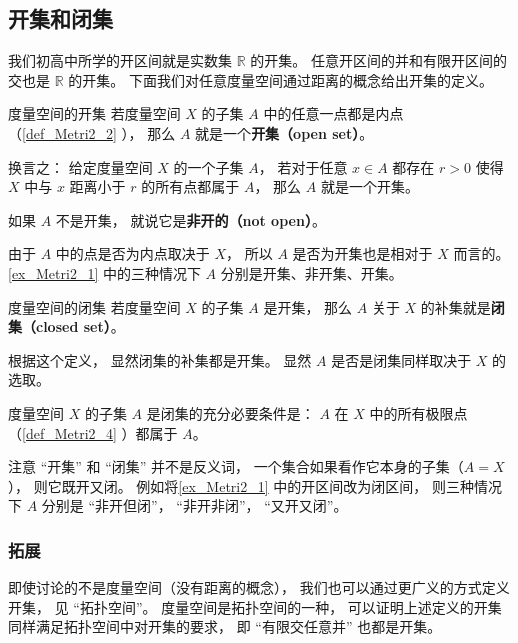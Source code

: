 
\subsection{开集和闭集}
我们初高中所学的开区间就是实数集 $\mathbb R$ 的开集。 任意开区间的并和有限开区间的交也是 $\mathbb R$ 的开集。 下面我们对任意度量空间通过距离的概念给出开集的定义。

\begin{definition}{度量空间的开集}
若度量空间 $X$ 的子集 $A$ 中的任意一点都是内点（\autoref{def_Metri2_2} ）， 那么 $A$ 就是一个\textbf{开集（open set）}。

换言之： 给定度量空间 $X$ 的一个子集 $A$， 若对于任意 $x \in A$ 都存在 $r > 0$ 使得 $X$ 中与 $x$ 距离小于 $r$ 的所有点都属于 $A$， 那么 $A$ 就是一个开集。

如果 $A$ 不是开集， 就说它是\textbf{非开的（not open）}。
\end{definition}
由于 $A$ 中的点是否为内点取决于 $X$， 所以 $A$ 是否为开集也是相对于 $X$ 而言的。 \autoref{ex_Metri2_1} 中的三种情况下 $A$ 分别是开集、非开集、开集。

\begin{definition}{度量空间的闭集}
若度量空间 $X$ 的子集 $A$ 是开集， 那么 $A$ 关于 $X$ 的补集就是\textbf{闭集（closed set）}。
\end{definition}
根据这个定义， 显然闭集的补集都是开集。 显然 $A$ 是否是闭集同样取决于 $X$ 的选取。

\begin{theorem}{}
度量空间 $X$ 的子集 $A$ 是闭集的充分必要条件是： $A$ 在 $X$ 中的所有极限点（\autoref{def_Metri2_4} ）都属于 $A$。
\end{theorem}
注意 “开集” 和 “闭集” 并不是反义词， 一个集合如果看作它本身的子集（$A = X$）， 则它既开又闭。 例如将\autoref{ex_Metri2_1} 中的开区间改为闭区间， 则三种情况下 $A$ 分别是 “非开但闭”， “非开非闭”， “又开又闭”。

\subsubsection{拓展}
即使讨论的不是度量空间（没有距离的概念）， 我们也可以通过更广义的方式定义开集， 见 “拓扑空间”。 度量空间是拓扑空间的一种， 可以证明上述定义的开集同样满足拓扑空间中对开集的要求， 即 “有限交任意并” 也都是开集。
